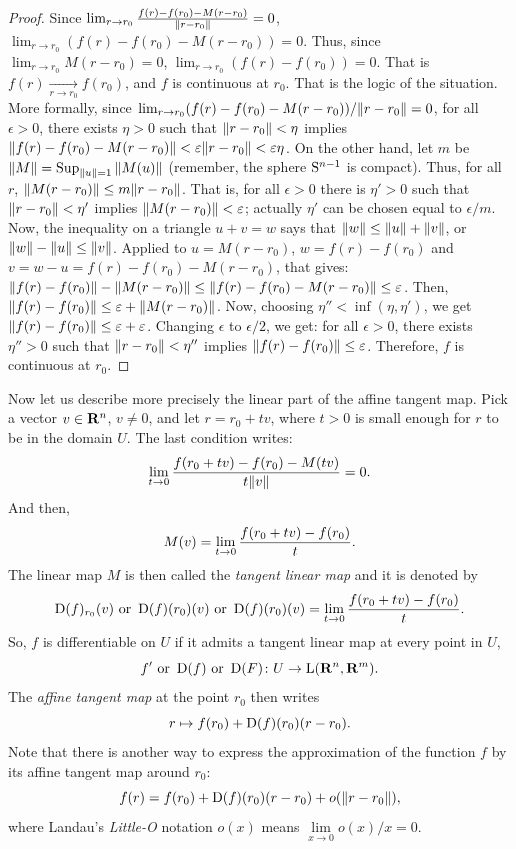 \begin{proof}
  Since $\lim_{r \to r_0} \frac{f(r)- f(r_0)- M(r-r_0)}{\Vert r-r_0 \Vert} = 0$,
  $\lim_{r \to r_0} (f(r)- f(r_0)- M(r-r_0)) = 0$.
  Thus,
  since $\lim_{r \to r_0}M(r-r_0)=0$,
  $\lim_{r \to r_0} (f(r)- f(r_0)) = 0$.
  That is $f(r) \xrightarrow[r \to r_0]{} f(r_0)$,
  and $f$ is continuous at $r_0$.
  That is the logic of the situation.
  More formally,
  since $\lim_{r \to r_0} (f(r)- f(r_0)- M(r-r_0))/\Vert r-r_0 \Vert = 0$,
  for all $\epsilon > 0$,
  there exists $\eta >0$ such that $\Vert r-r_0 \Vert<\eta$ implies $\Vert f(r)- f(r_0) - M(r-r_0) \Vert < \varepsilon \Vert r-r_0 \Vert < \varepsilon \eta$.
  On the other hand,
  let $m$ be $\Vert M \Vert = \operatorname{Sup}_{\Vert u \Vert=1} \Vert M(u) \Vert$ (remember, the sphere $\mathrm{S}^{n-1}$ is compact).
  Thus,
  for all $r$,
  $\Vert M(r-r_0) \Vert \leq m \Vert r-r_0 \Vert$.
  That is,
  for all $\epsilon >0$ there is $\eta'>0$ such that $\Vert r-r_0 \Vert<\eta'$ implies $\Vert M(r-r_0) \Vert < \varepsilon$;
  actually $\eta'$ can be chosen equal to $\epsilon/m$.
  Now,
  the inequality on a triangle $u + v = w$ says that $\Vert w \Vert \leq \Vert u \Vert + \Vert v \Vert$,
  or $\Vert w \Vert - \Vert u \Vert \leq \Vert v \Vert$.
  Applied to $u = M(r-r_0)$,
  $w = f(r)-f(r_0)$ and $v = w-u = f(r)-f(r_0) - M(r-r_0)$,
  that gives:
  $\Vert f(r)-f(r_0) \Vert - \Vert M(r-r_0) \Vert \leq \Vert f(r)- f(r_0) - M(r-r_0) \Vert \leq \varepsilon$.
  Then,
  $\Vert f(r)-f(r_0) \Vert \leq \varepsilon + \Vert M(r-r_0) \Vert$.
  Now,
  choosing $\eta'' < \inf(\eta, \eta')$,
  we get $\Vert f(r)-f(r_0) \Vert \leq \varepsilon + \varepsilon$.
  Changing $\epsilon$ to $\epsilon/2$,
  we get:
  for all $\epsilon > 0$,
  there exists $\eta'' > 0$ such that $\Vert r-r_0 \Vert < \eta''$ implies $\Vert f(r)-f(r_0) \Vert \leq \varepsilon$.
  Therefore,
  $f$ is continuous at $r_0$.
\end{proof}

Now let us describe more precisely the linear part of the affine tangent map.
Pick a vector $v \in \mathbf{R}^n$,
$v \neq 0$,
and let $r = r_0 + tv$,
where $t >0$ is small enough for $r$ to be in the domain $U$.
The last condition writes:
$$%
  \lim_{t \to 0} {f(r_0 + tv)- f(r_0)- M(tv) \over t \Norm{v}} = 0.
  $$%
And then,
$$%
  M(v) = \lim_{t \to 0} {f(r_0 + tv)- f(r_0) \over t}.
  $$%
The linear map $M$ is then called the \emph{tangent linear map} and it is denoted by
$$%
  \Der(f)_{r_0}(v) \text{ or } \Der(f)(r_0)(v) \text{ or } \Der(f)(r_0)(v) = \lim_{t \to 0} {f(r_0 + tv)- f(r_0) \over t}.
  $$%
So,
$f$ is differentiable on $U$ if it admits a tangent linear map at every point in $U$,
$$%
  f' \text{ or } \Der(f) \text{ or } \Der(F) \colon U \to \Lin(\RR^n,\RR^m).
  $$%
The \emph{affine tangent map} at the point $r_0$ then writes
$$%
  r \mapsto f(r_0) + \Der(f)(r_0)(r-r_0).
  $$%
Note that there is another way to express the approximation of the function $f$ by its affine tangent map around $r_0$:
$$%
  f(r) = f(r_0) + \Der(f)(r_0)(r-r_0) + o(\Norm{r-r_0}),
  $$%
where Landau's \emph{Little-O} notation $o(x)$ means $\underset{x \to 0}{\lim} o(x)/x = 0$.

